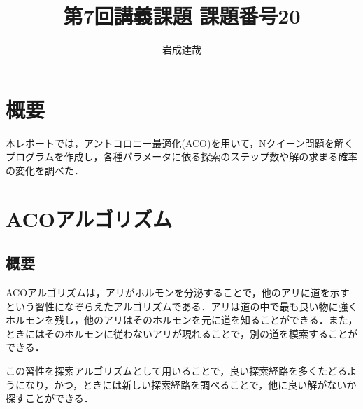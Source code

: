 \documentclass{jarticle}
\title{第7回講義課題 課題番号20}
\date{\todayd}
\author{岩成達哉}
\begin{document}
\begin{titlepage}
	\setlength{\topmargin}{1.1in}
	\vspace{100mm}
	\maketitle
\end{titlepage}

\section{概要}
本レポートでは，アントコロニー最適化(ACO)を用いて，Nクイーン問題を解くプログラムを作成し，各種パラメータに依る探索のステップ数や解の求まる確率の変化を調べた．



\section{ACOアルゴリズム}

\subsection{概要}
ACOアルゴリズムは，アリがホルモンを分泌することで，他のアリに道を示すという習性になぞらえたアルゴリズムである．アリは道の中で最も良い物に強くホルモンを残し，他のアリはそのホルモンを元に道を知ることができる．また，ときにはそのホルモンに従わないアリが現れることで，別の道を模索することができる．

この習性を探索アルゴリズムとして用いることで，良い探索経路を多くたどるようになり，かつ，ときには新しい探索経路を調べることで，他に良い解がないか探すことができる．
\end{document}
